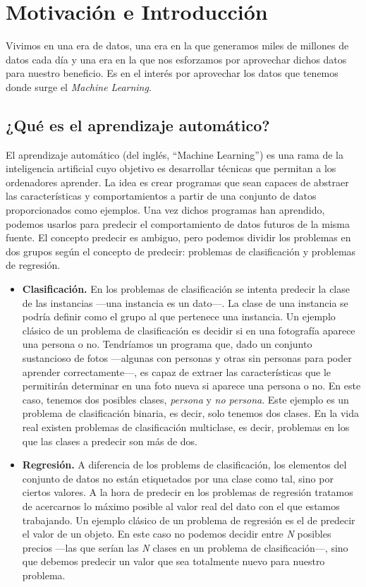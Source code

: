 \chapter{Motivación e Introducción} \label{ch:introduction}

Vivimos en una era de datos, una era en la que generamos miles de millones de datos cada día y una era en la que nos esforzamos por aprovechar dichos datos para nuestro beneficio. Es en el interés por aprovechar los datos que tenemos donde surge el \textit{Machine Learning}.

\section{¿Qué es el aprendizaje automático?} \label{sec:machinelearning}

El aprendizaje automático (del inglés, ``Machine Learning'') \cite{MLMurphy} es una rama de la inteligencia artificial cuyo objetivo es desarrollar técnicas que permitan a los ordenadores aprender. La idea es crear programas que sean capaces de abstraer las características y comportamientos a partir de una conjunto de datos proporcionados como ejemplos. Una vez dichos programas han aprendido, podemos usarlos para predecir el comportamiento de datos futuros de la misma fuente. El concepto predecir es ambiguo, pero podemos dividir los problemas en dos grupos según el concepto de predecir: problemas de clasificación y problemas de regresión.

\begin{itemize}
	\item \textbf{Clasificación.} En los problemas de clasificación se intenta predecir la clase de las instancias —una instancia es un dato—. La clase de una instancia se podría definir como el grupo al que pertenece una instancia. Un ejemplo clásico de un problema de clasificación es decidir si en una fotografía aparece una persona o no. Tendríamos un programa que, dado un conjunto sustancioso de fotos —algunas con personas y otras sin personas para poder aprender correctamente—, es capaz de extraer las características que le permitirán determinar en una foto nueva si aparece una persona o no. En este caso, tenemos dos posibles clases, \textit{persona} y \textit{no persona}. Este ejemplo es un problema de clasificación binaria, es decir, solo tenemos dos clases. En la vida real existen problemas de clasificación multiclase, es decir, problemas en los que las clases a predecir son más de dos.
	\item \textbf{Regresión.} A diferencia de los problems de clasificación, los elementos del conjunto de datos no están etiquetados por una clase como tal, sino por ciertos valores. A la hora de predecir en los problemas de regresión tratamos de acercarnos lo máximo posible al valor real del dato con el que estamos trabajando. Un ejemplo clásico de un problema de regresión es el de predecir el valor de un objeto. En este caso no podemos decidir entre \textit{N} posibles precios —las que serían las \textit{N} clases en un problema de clasificación—, sino que debemos predecir un valor que sea totalmente nuevo para nuestro problema.
\end{itemize}

